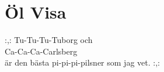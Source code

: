 \section{Öl Visa}
:,: Tu-Tu-Tu-Tuborg och\\
Ca-Ca-Ca-Carlsberg\\
är den bästa pi-pi-pi-pilsner som jag vet. :,: